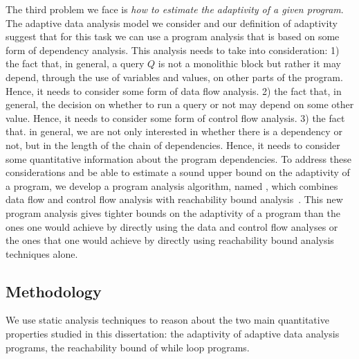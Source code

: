 The third problem we face is \emph{how to estimate the adaptivity of a given program}. 
The adaptive data analysis model we consider and our definition of adaptivity suggest that for this task we can use a  program analysis that is based on some form of dependency analysis. This analysis needs to take into consideration:
1) the fact that, in general, a query $Q$ is not a monolithic block but rather it may depend, through the use of variables and values, on other parts of the program. 
Hence, it needs to consider some form of data flow analysis. 
2) the fact that, in general, the decision on whether to run a query or not may depend on some other value. Hence, 
 it needs to consider some form of control flow analysis.
3) the fact that. in general, we are not only interested in whether there is a dependency or not, but in the length of the chain of dependencies. 
Hence, it needs to consider some quantitative information about the program dependencies. %
To address these considerations and be able to estimate a sound upper bound on the adaptivity of a program, 
we develop a program analysis algorithm, named {\ADAPTSYSTEM}, which combines data flow and control flow analysis with reachability bound analysis~\cite{GulwaniZ10}. 
This new program analysis gives tighter bounds on the adaptivity of a program than the ones one would achieve by directly using the data and control flow analyses or the ones that one would achieve by directly using reachability bound analysis techniques alone.
\subsection{Methodology}
We use static analysis techniques to reason about the two main quantitative properties studied in this dissertation: 
the adaptivity of adaptive data analysis programs,
the reachability bound of while loop programs. 

